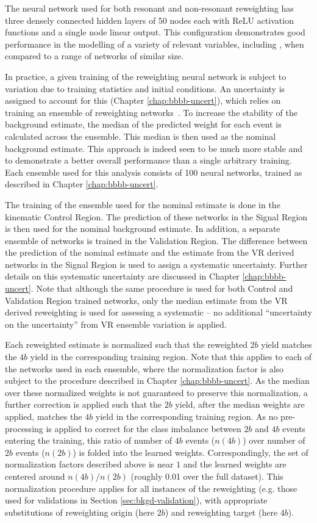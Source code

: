 The neural network used for both resonant and non-resonant reweighting has three 
densely connected hidden layers of 50 nodes each with ReLU activation functions and a single node 
linear output. This configuration demonstrates good performance in the modelling 
of a variety of relevant variables, including \mhh, when compared to a 
range of networks of similar size.

In practice, a given training of the reweighting neural network is subject to variation
due to training statistics and initial conditions. An uncertainty is assigned to account
for this (Chapter \ref{chap:bbbb-uncert}), which relies on training an ensemble of
reweighting networks~\cite{DeepEnsembles}. To increase the stability of the background estimate,
the median of the predicted weight for each event is calculated across the ensemble.
This median is then used as the nominal background estimate. This approach is indeed 
seen to be much more stable and to demonstrate a better overall performance than a 
single arbitrary training. Each ensemble used for this analysis consists of 100 
neural networks, trained as described in Chapter \ref{chap:bbbb-uncert}.

The training of the ensemble used for the nominal estimate is done in the kinematic
Control Region. The prediction of these networks in the Signal Region is then used
for the nominal background estimate. In addition, a separate ensemble of networks is 
trained in the Validation Region. The difference between the prediction of the nominal 
estimate and the estimate from the VR derived networks in the Signal Region is used to 
assign a systematic uncertainty. Further details on this systematic uncertainty are discussed 
in Chapter \ref{chap:bbbb-uncert}.
Note that although the same procedure is used for both Control and Validation Region trained 
networks, only the median estimate from the VR derived reweighting is used for assessing a 
systematic -- no additional ``uncertainty on the uncertainty'' from 
VR ensemble variation is applied.

Each reweighted estimate is normalized such that the reweighted $2b$ yield matches the $4b$ 
yield in the corresponding training region. Note that this applies to each of the networks 
used in each ensemble, where the normalization factor is also subject to the procedure described 
in Chapter \ref{chap:bbbb-uncert}. As the median over these normalized weights is not guaranteed 
to preserve this normalization, a further correction is applied such that the $2b$ yield, after 
the median weights are applied, matches the $4b$ yield in the corresponding training region. As no 
pre-processing is applied to correct for the class imbalance between $2b$ and $4b$ events entering 
the training, this ratio of number of $4b$ events ($n(4b)$) over number of $2b$ events ($n(2b)$) is 
folded into the learned weights. Correspondingly, the set of normalization factors described above is 
near $1$ and the learned weights are centered around $n(4b) / n(2b)$ (roughly 0.01 over the full dataset). 
This normalization procedure applies for all instances of the reweighting (e.g. those used for validations 
in Section \ref{sec:bkgd-validation}), with appropriate substitutions of reweighting origin 
(here $2b$) and reweighting target (here $4b$).

